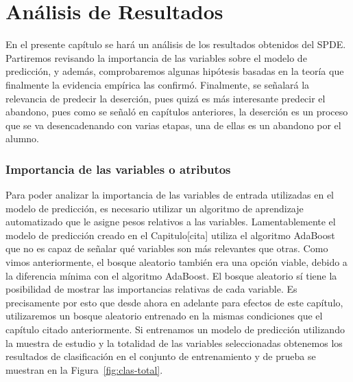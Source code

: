\chapter{Análisis de Resultados}
\label{ch:anarel}

En el presente capítulo se hará un análisis de los resultados obtenidos del SPDE. Partiremos revisando la importancia de las variables sobre el modelo de predicción, y además, comprobaremos algunas hipótesis basadas en la teoría que finalmente la evidencia empírica las confirmó. Finalmente, se señalará la relevancia de predecir la deserción, pues quizá es más interesante predecir el abandono, pues como se señaló en capítulos anteriores, la deserción es un proceso que se va desencadenando con varias etapas, una de ellas es un abandono por el alumno.

\subsection{Importancia de las variables o atributos}
Para poder analizar la importancia de las variables de entrada utilizadas en el modelo de predicción, es necesario utilizar un algoritmo de aprendizaje automatizado que le asigne pesos relativos a las variables. Lamentablemente el modelo de predicción creado en el Capitulo[cita] utiliza el algoritmo AdaBoost que no es capaz de señalar qué variables son más relevantes que otras. Como vimos anteriormente, el bosque aleatorio también era una opción viable, debido a la diferencia mínima con el algoritmo AdaBoost. El bosque aleatorio sí tiene la posibilidad de mostrar las importancias relativas de cada variable. Es precisamente por esto que desde ahora en adelante para efectos de este capítulo, utilizaremos un bosque aleatorio entrenado en la mismas condiciones que el capítulo citado anteriormente.
Si entrenamos un modelo de predicción utilizando la muestra de estudio y la totalidad de las variables seleccionadas obtenemos los resultados de clasificación en el conjunto de entrenamiento y de prueba se muestran en la Figura~\ref{fig:clas-total}.
